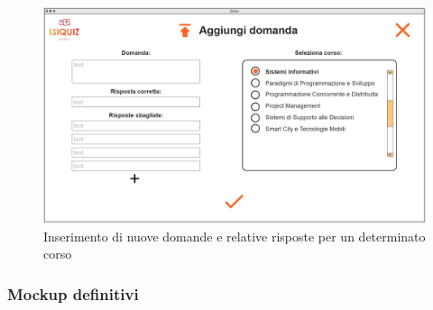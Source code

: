         \begin{figure}[H]
          \centering
          \begin{minipage}[b]{0.48\textwidth}
            \includegraphics[width=\textwidth]{Images/mockup/import2.jpg}
            \caption{Inserimento di nuove domande e relative risposte per un determinato corso}
            \label{fig:Import2}
          \end{minipage}
          \hfill
        \end{figure}
        
        \subsubsection{Mockup definitivi}\label{mockupFinished}
        
